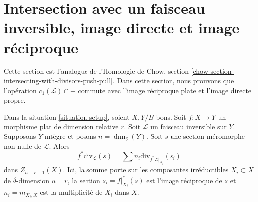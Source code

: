 \section{Intersection avec un faisceau inversible, image directe et image réciproque}
\label{section-intersecting-with-divisors-push-pull}

\noindent
Cette section est l'analogue de l'Homologie de Chow, section
\ref{chow-section-intersecting-with-divisors-push-pull}. Dans cette section,
nous prouvons que l'opération $c_1(\mathcal{L}) \cap -$ commute avec
l'image réciproque plate et l'image directe propre.

\begin{lemma}
\label{lemma-prepare-flat-pullback-cap-c1}
Dans la situation \ref{situation-setup}, soient $X, Y/B$ bons. Soit $f :
X \to Y$ un morphisme plat de dimension relative $r$. Soit $\mathcal{L}$ un
faisceau inversible sur $Y$. Supposons $Y$ intègre et posons $n =
\dim_\delta(Y)$. Soit $s$ une section méromorphe non nulle de $\mathcal{L}$.
Alors
$$
f^*\text{div}_\mathcal{L}(s) = \sum n_i\text{div}_{f^*\mathcal{L}|_{X_i}}(s_i)
$$
dans $Z_{n + r - 1}(X)$. Ici, la somme porte sur les composantes irréductibles
$X_i \subset X$ de $\delta$-dimension $n + r$, la section $s_i =
f|_{X_i}^*(s)$ est l'image réciproque de $s$ et $n_i = m_{X_i, X}$ est la multiplicité
de $X_i$ dans $X$.
\end{lemma}

